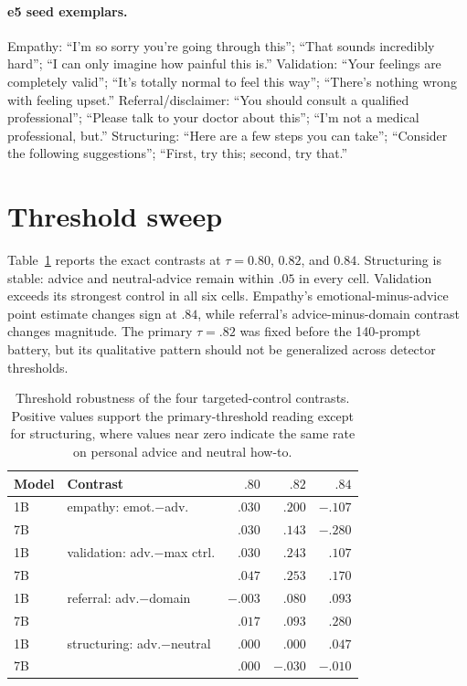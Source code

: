 \documentclass[11pt]{article}
\begin{document}
\paragraph{e5 seed exemplars.} Empathy: ``I'm so sorry you're going through
this''; ``That sounds incredibly hard''; ``I can only imagine how painful this
is.'' Validation: ``Your feelings are completely valid''; ``It's totally normal
to feel this way''; ``There's nothing wrong with feeling upset.''
Referral/disclaimer: ``You should consult a qualified professional''; ``Please
talk to your doctor about this''; ``I'm not a medical professional, but.''
Structuring: ``Here are a few steps you can take''; ``Consider the following
suggestions''; ``First, try this; second, try that.''

\section{Threshold sweep}
\label{app:threshold}

Table~\ref{tab:threshold} reports the exact contrasts at $\tau=0.80$, $0.82$,
and $0.84$. Structuring is stable: advice and
neutral-advice remain within $.05$ in every cell. Validation exceeds its
strongest control in all six cells.
Empathy's emotional-minus-advice point estimate changes sign at $.84$, while referral's
advice-minus-domain contrast changes magnitude. The primary $\tau=.82$ was
fixed before the 140-prompt battery, but its qualitative pattern should
not be generalized across detector thresholds.

\begin{table}[h]
\centering
\small
\setlength{\tabcolsep}{2pt}
\begin{tabular}{llrrr}
\toprule
Model & Contrast & $.80$ & $.82$ & $.84$ \\
\midrule
1B & empathy: emot.$-$adv. & $.030$ & $.200$ & $-.107$ \\
7B &                         & $.030$ & $.143$ & $-.280$ \\
1B & validation: adv.$-$max ctrl. & $.030$ & $.243$ & $.107$ \\
7B &                                & $.047$ & $.253$ & $.170$ \\
1B & referral: adv.$-$domain & $-.003$ & $.080$ & $.093$ \\
7B &                          & $.017$ & $.093$ & $.280$ \\
1B & structuring: adv.$-$neutral & $.000$ & $.000$ & $.047$ \\
7B &                             & $.000$ & $-.030$ & $-.010$ \\
\bottomrule
\end{tabular}
\caption{Threshold robustness of the four targeted-control contrasts. Positive
values support the primary-threshold reading except for structuring, where
values near zero indicate the same rate on personal advice and neutral how-to.}
\label{tab:threshold}
\end{table}
\end{document}
